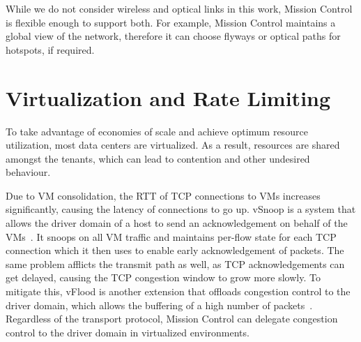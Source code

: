 \documentclass[a4paper,12pt,twoside,openright]{report}
\begin{document}
While we do not consider wireless and optical links in this work, Mission
Control is flexible enough to support both. For example, Mission Control
maintains a global view of the network, therefore it can choose flyways or
optical paths for hotspots, if required.

\section{Virtualization and Rate Limiting}
To take advantage of economies of scale and achieve optimum resource
utilization, most data centers are virtualized. As a result, resources are
shared amongst the tenants, which can lead to contention and other undesired
behaviour.

Due to VM consolidation, the RTT of TCP connections to VMs increases
significantly, causing the latency of connections to go up. vSnoop is a system
that allows the driver domain of a host to send an acknowledgement on behalf of
the VMs~\cite{Kangarlou:2010:VIT}. It snoops on all VM traffic and maintains
per-flow state for each TCP connection which it then uses to enable early
acknowledgement of packets. The same problem afflicts the transmit path as well,
as TCP acknowledgements can get delayed, causing the TCP congestion window to
grow more slowly. To mitigate this, vFlood is another extension that offloads
congestion control to the driver domain, which allows the buffering of a high
number of packets~\cite{Gamage:2011:OFI}. Regardless of the transport protocol,
Mission Control can delegate congestion control to the driver domain in
virtualized environments.
\end{document}
